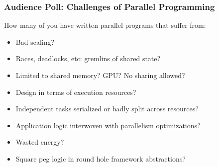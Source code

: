 \begin{frame}
\frametitle{Audience Poll: Challenges of Parallel Programming}
How many of you have written parallel programs that suffer from:
\begin{itemize}
\pause
{}
\pause
\item Bad scaling?
\item Races, deadlocks, etc: gremlins of shared state?
\pause
\item Limited to shared memory? GPU? No sharing allowed?
\pause
\item Design in terms of execution resources?
\pause
\item Independent tasks serialized or badly split across resources?
\pause
\item Application logic interwoven with parallelism optimizations?
\pause
\item Wasted energy?
\pause
\item Square peg logic in round hole framework abstractions?
\end{itemize}
\end{frame}
